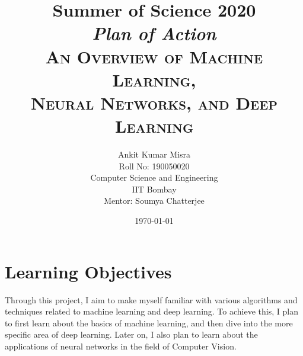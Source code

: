 \documentclass[a4paper, 12pt]{article}
\begin{document}
\title{
	{\huge\bf Summer of Science 2020} \\
	[0.5cm]
	\textit{Plan of Action} \\
	[1.5cm]
	{\Large\scshape An Overview of Machine Learning,\\Neural Networks, and Deep Learning} \\
	[2cm]
}
\author{
	Ankit Kumar Misra \\
	Roll No: 190050020 \\
	Computer Science and Engineering \\
	IIT Bombay \\
	[2cm]
	Mentor: Soumya Chatterjee \\
	[2cm]
}
\date{\today}
\maketitle
{}

\newpage

\section{Learning Objectives}
Through this project, I aim to make myself familiar with various algorithms and techniques related to machine learning and deep learning. To achieve this, I plan to first learn about the basics of machine learning, and then dive into the more specific area of deep learning. Later on, I also plan to learn about the applications of neural networks in the field of Computer Vision.
\end{document}
